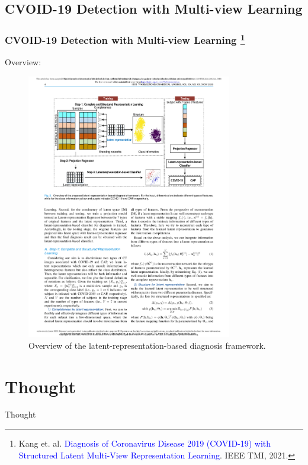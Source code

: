 \documentclass[notheorems, aspectratio=54]{beamer}
\begin{document}
\subsection{CVOID-19 Detection with Multi-view Learning}

\begin{frame} \frametitle{CVOID-19 Detection with Multi-view Learning \footnote{Kang et. al. \textcolor{blue}{Diagnosis of Coronavirus Disease 2019 (COVID-19) with Structured Latent Multi-View Representation Learning}. IEEE TMI, 2021.}}

Overview:

\begin{figure}
\centering
\includegraphics[width=0.8\textwidth]{./fig/overview_covid19.pdf}
\caption{Overview of the latent-representation-based diagnosis framework. }
\label{fig:overview_covid19}
\end{figure}


\end{frame}


\section{Thought}

\begin{frame}
    
    \centering
    \LARGE Thought
    
\end{frame}
\end{document}
